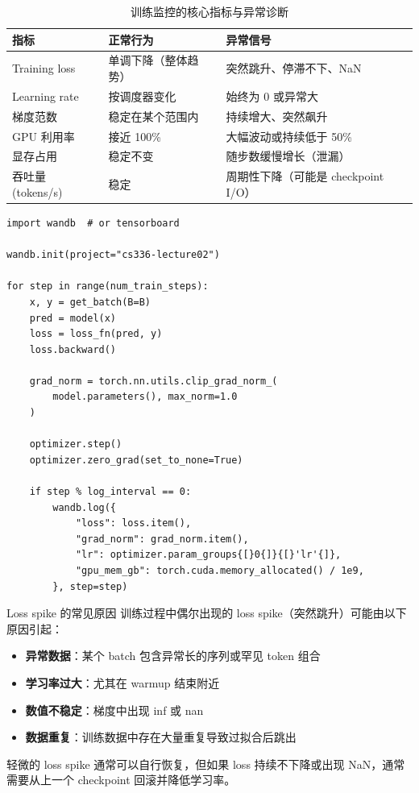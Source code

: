 \documentclass[a4paper]{article}
\begin{document}
\begin{table}[H]
\centering
\begin{tabular}{p{}p{}p{}}
\toprule
\textbf{指标} & \textbf{正常行为} & \textbf{异常信号} \\
\midrule
Training loss & 单调下降（整体趋势） & 突然跳升、停滞不下、NaN \\
Learning rate & 按调度器变化 & 始终为 0 或异常大 \\
梯度范数 & 稳定在某个范围内 & 持续增大、突然飙升 \\
GPU 利用率 & 接近 100\% & 大幅波动或持续低于 50\% \\
显存占用 & 稳定不变 & 随步数缓慢增长（泄漏） \\
吞吐量 (tokens/s) & 稳定 & 周期性下降（可能是 checkpoint I/O） \\
\bottomrule
\end{tabular}
\caption{训练监控的核心指标与异常诊断}
\end{table}

\begin{lstlisting}[caption={训练循环中的日志记录示例}]
import wandb  # or tensorboard

wandb.init(project="cs336-lecture02")

for step in range(num_train_steps):
    x, y = get_batch(B=B)
    pred = model(x)
    loss = loss_fn(pred, y)
    loss.backward()

    grad_norm = torch.nn.utils.clip_grad_norm_(
        model.parameters(), max_norm=1.0
    )

    optimizer.step()
    optimizer.zero_grad(set_to_none=True)

    if step % log_interval == 0:
        wandb.log({
            "loss": loss.item(),
            "grad_norm": grad_norm.item(),
            "lr": optimizer.param_groups{[}0{]}{[}'lr'{]},
            "gpu_mem_gb": torch.cuda.memory_allocated() / 1e9,
        }, step=step)
\end{lstlisting}

\begin{knowledgebox}{Loss spike 的常见原因}
训练过程中偶尔出现的 loss spike（突然跳升）可能由以下原因引起：
\begin{itemize}
    \item \textbf{异常数据}：某个 batch 包含异常长的序列或罕见 token 组合
    \item \textbf{学习率过大}：尤其在 warmup 结束附近
    \item \textbf{数值不稳定}：梯度中出现 inf 或 nan
    \item \textbf{数据重复}：训练数据中存在大量重复导致过拟合后跳出
\end{itemize}
轻微的 loss spike 通常可以自行恢复，但如果 loss 持续不下降或出现 NaN，通常需要从上一个 checkpoint 回滚并降低学习率。
\end{knowledgebox}
\end{document}
